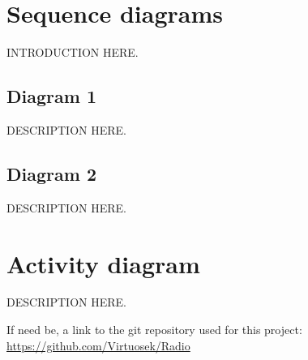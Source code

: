 \documentclass[11pt]{article}
\begin{document}
\pagebreak
\section{Sequence diagrams}
INTRODUCTION HERE.
\subsection{Diagram 1}
\vspace{10px}
\begin{center}
\end{center}
DESCRIPTION HERE.
\subsection{Diagram 2}
\vspace{10px}
\begin{center}
\end{center}
DESCRIPTION HERE.

\pagebreak
\section{Activity diagram}
\vspace{10px}
\begin{center}
\end{center}
DESCRIPTION HERE.


\pagebreak
If need be, a link to the git repository used for this project:\\
\url{https://github.com/Virtuosek/Radio}
\end{document}
